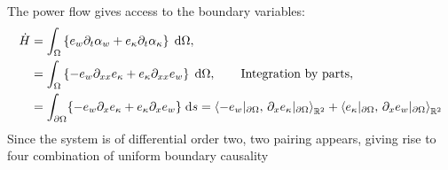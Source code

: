 The power flow gives access to the boundary variables:
\begin{equation}
\begin{aligned}
\dot{H} &= \int_{\Omega} \left\{e_w \partial_t \alpha_w + e_\kappa \partial_t \alpha_\kappa \right\}  \d{\Omega}, \\
&= \int_{\Omega} \left\{-e_w \partial_{xx}e_\kappa + e_\kappa \partial_{xx} e_w \right\} \d{\Omega}, \qquad \text{Integration by parts}, \\
&= \int_{\partial\Omega}\{-e_w \partial_{x}e_\kappa + e_\kappa \partial_{x} e_w \} \d{s}= \inner[\bbR^2]{-e_w\vert_{\partial\Omega}}{\partial_{x}e_\kappa\vert_{\partial\Omega}} + \inner[\bbR^2]{e_\kappa\vert_{\partial\Omega}}{\partial_{x}e_w\vert_{\partial\Omega}}
\end{aligned}
\end{equation}
Since the system is of differential order two, two pairing appears, giving rise to four combination of uniform boundary causality
